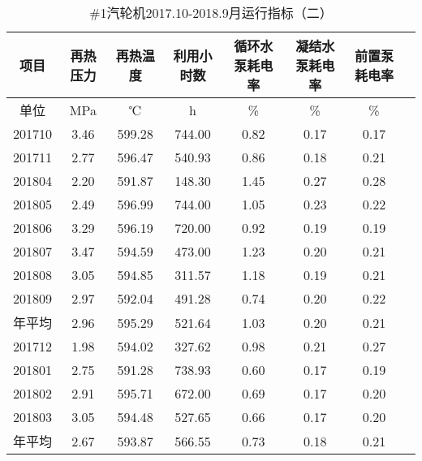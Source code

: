 \documentclass[a4paper, 11pt]{article}
\begin{document}
\begin{table}[H]
\centering
\caption{\#1汽轮机2017.10-2018.9月运行指标（二）}  %
\label{汽轮机2017.10-2018.9月运行指标2）}
\begin {tabular}{|c|c|c|c|c|c|c|c|}
\hline
项目&再热压力&再热温度&利用小时数&循环水泵耗电率&凝结水泵耗电率&前置泵耗电率\\
\hline
单位&MPa&℃&h&\%&\%&\%\\
\hline
201710&3.46&599.28&744.00&0.82&0.17&0.17\\
\hline
201711&2.77&596.47&540.93&0.86&0.18&0.21\\
\hline
201804&2.20&591.87&148.30&1.45&0.27&0.28\\
\hline
201805&2.49&596.99&744.00&1.05&0.23&0.22\\
\hline
201806&3.29&596.19&720.00&0.92&0.19&0.19\\
\hline
201807&3.47&594.59&473.00&1.23&0.20&0.21\\
\hline
201808&3.05&594.85&311.57&1.18&0.19&0.21\\
\hline
201809&2.97&592.04&491.28&0.74&0.20&0.22\\
\hline
年平均&2.96&595.29&521.64&1.03&0.20&0.21\\
\hline
201712&1.98&594.02&327.62&0.98&0.21&0.27\\
\hline
201801&2.75&591.28&738.93&0.60&0.17&0.19\\
\hline
201802&2.91&595.71&672.00&0.69&0.17&0.20\\
\hline
201803&3.05&594.48&527.65&0.66&0.17&0.20\\
\hline
年平均&2.67&593.87&566.55&0.73&0.18&0.21\\
\hline
\end{tabular}
\end{table}
\end{document}
